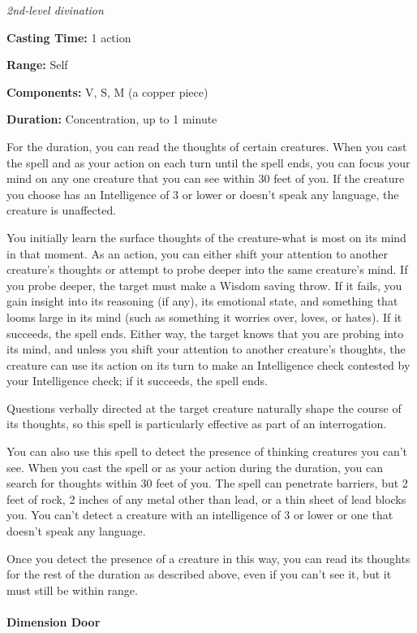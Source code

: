 \documentclass[
]{article}
\begin{document}
\emph{2nd-level divination}

\textbf{Casting Time:} 1 action

\textbf{Range:} Self

\textbf{Components:} V, S, M (a copper piece)

\textbf{Duration:} Concentration, up to 1 minute

For the duration, you can read the thoughts of certain creatures. When
you cast the spell and as your action on each turn until the spell ends,
you can focus your mind on any one creature that you can see within 30
feet of you. If the creature you choose has an Intelligence of 3 or
lower or doesn't speak any language, the creature is unaffected.

You initially learn the surface thoughts of the creature-what is most on
its mind in that moment. As an action, you can either shift your
attention to another creature's thoughts or attempt to probe deeper into
the same creature's mind. If you probe deeper, the target must make a
Wisdom saving throw. If it fails, you gain insight into its reasoning
(if any), its emotional state, and something that looms large in its
mind (such as something it worries over, loves, or hates). If it
succeeds, the spell ends. Either way, the target knows that you are
probing into its mind, and unless you shift your attention to another
creature's thoughts, the creature can use its action on its turn to make
an Intelligence check contested by your Intelligence check; if it
succeeds, the spell ends.

Questions verbally directed at the target creature naturally shape the
course of its thoughts, so this spell is particularly effective as part
of an interrogation.

You can also use this spell to detect the presence of thinking creatures
you can't see. When you cast the spell or as your action during the
duration, you can search for thoughts within 30 feet of you. The spell
can penetrate barriers, but 2 feet of rock, 2 inches of any metal other
than lead, or a thin sheet of lead blocks you. You can't detect a
creature with an intelligence of 3 or lower or one that doesn't speak
any language.

Once you detect the presence of a creature in this way, you can read its
thoughts for the rest of the duration as described above, even if you
can't see it, but it must still be within range.

\hypertarget{dimension-door}{%
\paragraph{Dimension Door}\label{dimension-door}}
\end{document}
